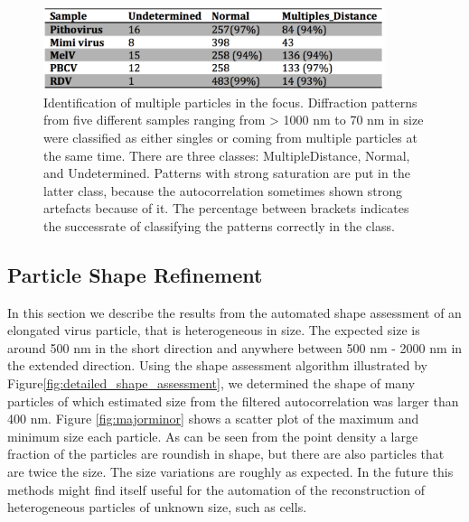 \begin{figure}[!h]
\centering
\includegraphics[width=100mm]{Chapter_09_Results_successrate.png}
\caption{Identification of multiple particles in the focus. Diffraction patterns from five different samples ranging from > 1000 nm to 70 nm in size were classified as either singles or coming from multiple particles at the same time. There are three classes: MultipleDistance, Normal, and Undetermined. Patterns with strong saturation are put in the latter class, because the autocorrelation sometimes shown strong artefacts because of it. The percentage between brackets indicates the successrate of classifying the patterns correctly in the class.}\label{fig:multiple_find}

\end{figure}

\subsection{Particle Shape Refinement}

In this section we describe the results from the automated shape assessment of an elongated virus particle, that is heterogeneous in size. The expected size is around 500 nm in the short direction and anywhere between 500 nm - 2000 nm in the extended direction. Using the shape assessment algorithm illustrated by Figure\ref{fig:detailed_shape_assessment}, we determined the shape of many particles of which estimated size from the filtered autocorrelation was larger than 400 nm. Figure \ref{fig:majorminor} shows a scatter plot of the maximum and minimum size each particle. As can be seen from the point density a large fraction of the particles are roundish in shape, but there are also particles that are twice the size. The size variations are roughly as expected. In the future this methods might find itself useful for the automation of the reconstruction of heterogeneous particles of unknown size, such as cells.

